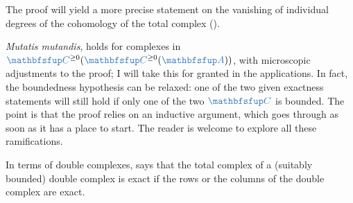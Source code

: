 The proof will yield a more precise statement on the vanishing of
individual degrees of the cohomology of the total complex
().

\emph{Mutatis mutandis},  holds for
complexes in $\categ{C}^{\ge 0}(\categ{C}^{\ge 0}(\categ{A}))$, with
microscopic adjustments to the proof; I will take this for granted in
the applications. In fact, the boundedness hypothesis can be relaxed:
one of the two given exactness statements will still hold if only one
of the two $\categ{C}$ is bounded. The point is that the proof relies
on an inductive argument, which goes through as soon as it has a place
to start. The reader is welcome to explore all these ramifications.

In terms of double complexes,  says that
the total complex of a (suitably bounded) double complex is exact if
the rows or the columns of the double complex are exact.

